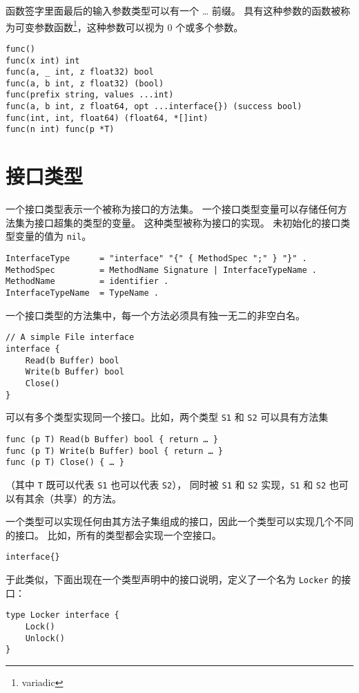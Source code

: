 函数签字里面最后的输入参数类型可以有一个 \dots{} 前缀。
具有这种参数的函数被称为可变参数函数\footnote{variadic}，这种参数可以视为 0 个或多个参数。
\begin{lstlisting}[style=golang]
func()
func(x int) int
func(a, _ int, z float32) bool
func(a, b int, z float32) (bool)
func(prefix string, values ...int)
func(a, b int, z float64, opt ...interface{}) (success bool)
func(int, int, float64) (float64, *[]int)
func(n int) func(p *T)
\end{lstlisting}


\section{接口类型}
一个接口类型表示一个被称为接口的方法集。
一个接口类型变量可以存储任何方法集为接口超集的类型的变量。
这种类型被称为接口的实现。
未初始化的接口类型变量的值为 \lstinline|nil|。
\begin{lstlisting}[style=EBNF]
InterfaceType      = "interface" "{" { MethodSpec ";" } "}" .
MethodSpec         = MethodName Signature | InterfaceTypeName .
MethodName         = identifier .
InterfaceTypeName  = TypeName .
\end{lstlisting}

一个接口类型的方法集中，每一个方法必须具有独一无二的非空白名。
\begin{lstlisting}[style=golang]
// A simple File interface
interface {
	Read(b Buffer) bool
	Write(b Buffer) bool
	Close()
}
\end{lstlisting}

可以有多个类型实现同一个接口。比如，两个类型 \lstinline|S1| 和 \lstinline|S2| 可以具有方法集
\begin{lstlisting}[style=golang]
func (p T) Read(b Buffer) bool { return … }
func (p T) Write(b Buffer) bool { return … }
func (p T) Close() { … }
\end{lstlisting}

（其中 \lstinline|T| 既可以代表 \lstinline|S1| 也可以代表 \lstinline|S2|），
同时被 \lstinline|S1| 和 \lstinline|S2| 实现，\lstinline|S1| 和 \lstinline|S2| 也可以有其余（共享）的方法。

一个类型可以实现任何由其方法子集组成的接口，因此一个类型可以实现几个不同的接口。
比如，所有的类型都会实现一个空接口。
\begin{lstlisting}[style=golang]
interface{}
\end{lstlisting}

于此类似，下面出现在一个类型声明中的接口说明，定义了一个名为 \lstinline|Locker| 的接口：
\begin{lstlisting}[style=golang]
type Locker interface {
	Lock()
	Unlock()
}
\end{lstlisting}


